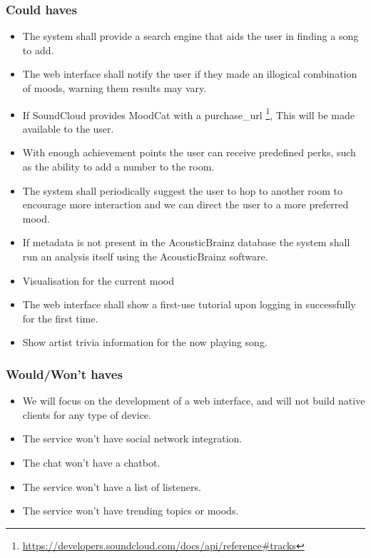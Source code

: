 \subsubsection{Could haves}
\begin{itemize}
\item The system shall provide a search engine that aids the user in finding a song to add.

\item The web interface shall notify the user if they made an illogical combination of moods, warning them results may vary.

\item If SoundCloud provides MoodCat with a purchase\_url \footnote{\url{https://developers.soundcloud.com/docs/api/reference\#tracks}}, This will be made available to the user.

\item With enough achievement points the user can receive predefined perks, such as the ability to add a number to the room.

\item The system shall periodically suggest the user to hop to another room to encourage more interaction and we can direct the user to a more preferred mood.

\item If metadata is not present in the AcousticBrainz database the system shall run an analysis itself using the AcousticBrainz software.

\item Visualisation for the current mood

\item The web interface shall show a first-use tutorial upon logging in successfully for the first time.

\item Show artist trivia information for the now playing song.

\end{itemize}

\subsubsection{Would/Won't haves}
\begin{itemize}
\item We will focus on the development of a web interface, and will not build native clients for any type of device.

\item The service won't have social network integration.

\item The chat won't have a chatbot.

\item The service won't have a list of listeners.

\item The service won't have trending topics or moods.

\end{itemize}

